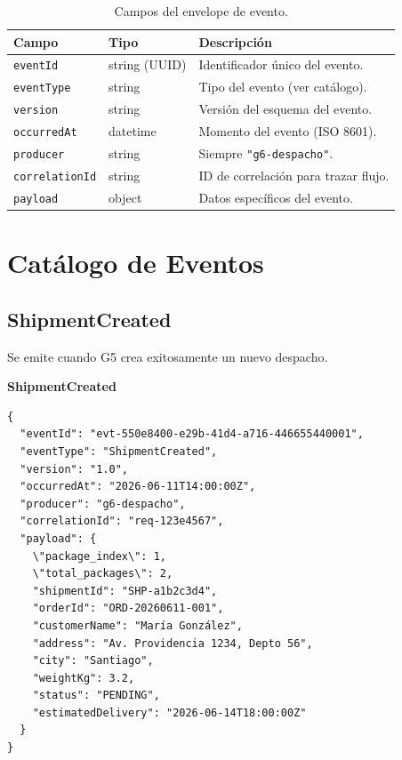 \documentclass[11pt, a4paper]{article}
\newcommand{\contractheader}[1]{%
  \noindent\colorbox{primary!10}{%
    \parbox{\dimexpr\textwidth-2\fboxsep}{%
      \textbf{\faFileCode\quad #1}%
    }%
  }
  \vspace{0.3cm}
}
\begin{document}
\begin{table}[h!]
\centering
\renewcommand{\arraystretch}{1.3}
\begin{tabularx}{\textwidth}{l l X}
  \toprule
  \textbf{Campo} & \textbf{Tipo} & \textbf{Descripción} \\
  \midrule
  \texttt{eventId}       & string (UUID) & Identificador único del evento. \\
  \texttt{eventType}     & string        & Tipo del evento (ver catálogo). \\
  \texttt{version}       & string        & Versión del esquema del evento. \\
  \texttt{occurredAt}    & datetime      & Momento del evento (ISO 8601). \\
  \texttt{producer}      & string        & Siempre \texttt{"g6-despacho"}. \\
  \texttt{correlationId} & string        & ID de correlación para trazar flujo. \\
  \texttt{payload}       & object        & Datos específicos del evento. \\
  \bottomrule
\end{tabularx}
\caption{Campos del envelope de evento.}
\end{table}


\section{Catálogo de Eventos}

\subsection{ShipmentCreated}

Se emite cuando G5 crea exitosamente un nuevo despacho.

\contractheader{ShipmentCreated}

\begin{lstlisting}
{
  "eventId": "evt-550e8400-e29b-41d4-a716-446655440001",
  "eventType": "ShipmentCreated",
  "version": "1.0",
  "occurredAt": "2026-06-11T14:00:00Z",
  "producer": "g6-despacho",
  "correlationId": "req-123e4567",
  "payload": {
    \"package_index\": 1,
    \"total_packages\": 2,
    "shipmentId": "SHP-a1b2c3d4",
    "orderId": "ORD-20260611-001",
    "customerName": "María González",
    "address": "Av. Providencia 1234, Depto 56",
    "city": "Santiago",
    "weightKg": 3.2,
    "status": "PENDING",
    "estimatedDelivery": "2026-06-14T18:00:00Z"
  }
}
\end{lstlisting}
\end{document}
